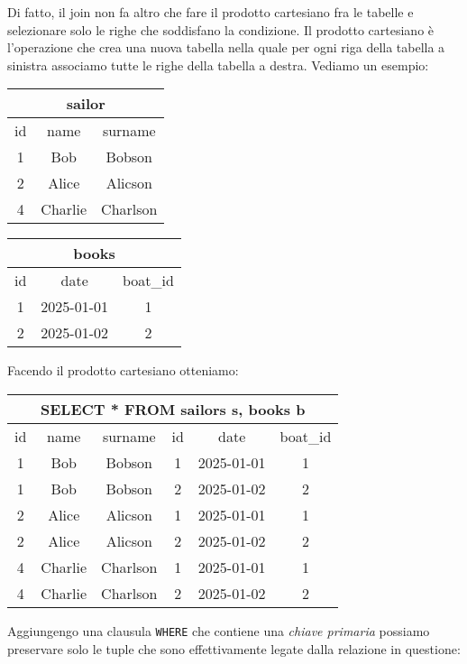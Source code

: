 Di fatto, il join non fa altro che fare il prodotto cartesiano fra le tabelle e selezionare solo le righe che soddisfano la condizione. Il prodotto cartesiano è l'operazione che crea una nuova tabella nella quale per ogni riga della tabella a sinistra associamo tutte le righe della tabella a destra. Vediamo un esempio:
\vskip3mm
\begin{center}
	\begin{tabular}{|c | c c|}
		\multicolumn{3}{c}{sailor} \\
		\hline
		id & name    & surname     \\
		\hline
		\hline
		1  & Bob     & Bobson      \\
		2  & Alice   & Alicson     \\
		4  & Charlie & Charlson    \\
		\hline
	\end{tabular}
	\begin{tabular}{| c | c | c |}
		\multicolumn{3}{c}{books}  \\
		\hline
		id & date       & boat\_id \\
		\hline
		\hline
		1  & 2025-01-01 & 1        \\
		2  & 2025-01-02 & 2        \\
		\hline
	\end{tabular}
\end{center}
\vskip3mm
Facendo il prodotto cartesiano otteniamo:
\begin{center}
	\begin{tabular}{| c | c | c | c | c | c |}
		\multicolumn{6}{c}{\ttfamily SELECT * FROM sailors s, books b} \\
		\hline
		id & name    & surname  & id & date       & boat\_id           \\
		\hline
		\hline
		1  & Bob     & Bobson   & 1  & 2025-01-01 & 1                  \\
		1  & Bob     & Bobson   & 2  & 2025-01-02 & 2                  \\
		\hline
		2  & Alice   & Alicson  & 1  & 2025-01-01 & 1                  \\
		2  & Alice   & Alicson  & 2  & 2025-01-02 & 2                  \\
		\hline
		4  & Charlie & Charlson & 1  & 2025-01-01 & 1                  \\
		4  & Charlie & Charlson & 2  & 2025-01-02 & 2                  \\
		\hline
	\end{tabular}
\end{center}
Aggiungengo una clausula \verb|WHERE| che contiene una \textit{chiave primaria} possiamo preservare solo le tuple che sono effettivamente legate dalla relazione in questione:

